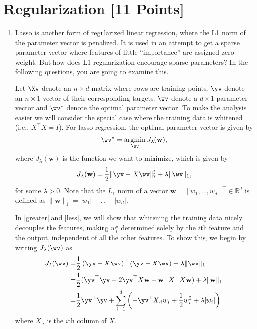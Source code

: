 \section{Regularization [11 Points]}

\begin{enumerate}

\item Lasso is another form of regularized linear regression, where the L1 norm of the parameter vector is penalized. It is used in an attempt to get a sparse parameter vector where features of little ``importance'' are assigned zero weight. But how does L1 regularization encourage sparse parameters? In the following questions, you are going to examine this.

Let $\Xv$ denote an $n \times d$ matrix where rows are training points, $\yv$ denote an $n \times 1$ vector of their corresponding targets, $\wv$ denote a $d \times 1$ parameter vector and $\wv^\star$ denote the optimal parameter vector. To make the analysis easier we will consider the special case where the training data is whitened (i.e., $X^\top X = I$). For lasso regression, the optimal parameter vector is given by
\begin{align*}
\wv^\star = \argmin_{\wv} J_\lambda(\mathbf{w}),
\end{align*}
where $J_\lambda(\mathbf{w})$ is the function we want to minimize, which is given by
\begin{align*}
    J_\lambda(\mathbf{w}) = \frac{1}{2} \|\yv - X\wv\|_2^2 + \lambda \|\wv\|_1,
\end{align*}
for some $\lambda > 0$. Note that the $L_1$ norm of a vector $\mathbf{w} = [w_1, \ldots ,w_d]^\top \in \mathbb{R}^d$ is defined as $\|\mathbf{w}\|_1 = |w_1| + \ldots + |w_d|$.



In \ref{greater} and \ref{less}, we will show that whitening the training data nicely decouples the features, making $w_i^\star$ determined solely by the $i$th feature and the output, independent of all the other features. To show this, we begin by writing $J_\lambda (\wv)$ as
    \begin{align*}
    J_\lambda (\wv)
        =& \frac{1}{2} \left(\yv - X\wv\right)^\top\left(\yv - X\wv\right) + \lambda \|\wv\|_1 \\
        =& \frac{1}{2}(\yv^\top \yv - 2 \yv^\top X \mathbf{w} + \mathbf{w}^\top X^\top X \mathbf{w}) + \lambda \| \mathbf{w} \|_1 \\
        =& \frac{1}{2}\yv^\top \yv + \sum_{i=1}^d \left(-\yv^\top X_{\cdot i} w_i + \frac{1}{2}w_i^2 + \lambda  |w_i| \right)
    \end{align*}
where $X_{\cdot i}$ is the $i$th column of $X$.
\clearpage
\begin{enumerate}


\end{enumerate}
\end{enumerate}
